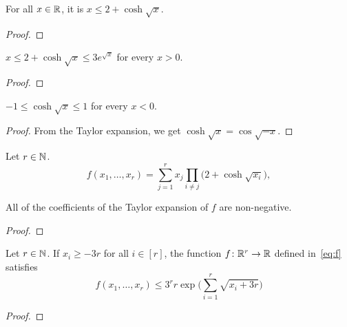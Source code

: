 \begin{lemma}
  \label{lem:le-coshsqrt}
  For all $x \in \mathbb{R}$, it is $x \le 2 + \cosh\sqrt{x}$.
\end{lemma}
\begin{proof}
\end{proof}

\begin{lemma}
  \label{lem:coshsqrt-bd-pos}
  $x \le 2 + \cosh \sqrt{x} \le 3 e^{\sqrt{x}}$ for every $x > 0$.
\end{lemma}
\begin{proof}
\end{proof}

\begin{lemma}
  \label{lem:coshsqrt-bd-neg}
  $-1 \le \cosh \sqrt{x} \le 1$ for every $x < 0$.
\end{lemma}
\begin{proof}
  From the Taylor expansion, we get $\cosh \sqrt{x} = \cos \sqrt{-x}$.
\end{proof}

\begin{definition}
  \label{def:f}
  Let $r \in \mathbb{N}$.
  \begin{equation}\label{eq:f}
    f(x_1,\dots,x_r) = \sum_{j = 1}^r x_j \prod_{i \ne j} \big( 2 + \cosh\sqrt{x_i} \big),
  \end{equation}
\end{definition}

\begin{lemma}
  \label{lem:taylor-nonneg}
  All of the coefficients of the Taylor expansion of $f$ are non-negative.
\end{lemma}
\begin{proof}
\end{proof}

\begin{lemma}
  \label{lem:special-function-e}
  Let $r \in \mathbb{N}$. If $x_i \ge - 3r$ for all $i \in [r]$, the function $f \colon \mathbb{R}^r \rightarrow \mathbb{R}$ defined in~\eqref{eq:f} satisfies 
  $$ f(x_1,\dots,x_r) \le 3^r r \exp\bigg( \displaystyle\sum_{i = 1}^r \sqrt{ x_i + 3r } \bigg)$$
  \end{lemma}
  \begin{proof}
  \end{proof}

